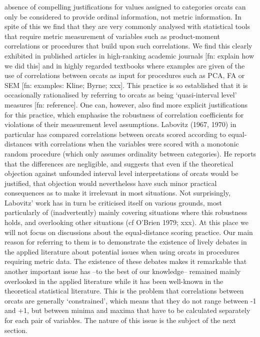\documentclass[
  12pt,
]{article}
\theoremstyle{plain}
\theoremstyle{definition}
\theoremstyle{remark}
\begin{document}
absence of compelling justifications for values assigned to categories
orcats can only be considered to provide ordinal information, not metric
information. In spite of this we find that they are very commonly
analysed with statistical tools that require metric measurement of
variables such as product-moment correlations or procedures that build
upon such correlations. We find this clearly exhibited in published
articles in high-ranking academic journals {[}fn: explain how we did
this{]} and in highly regarded textbooks where examples are given of the
use of correlations between orcats as input for procedures such as PCA,
FA or SEM {[}fn: examples: Kline; Byrne; xxx{]}. This practice is so
established that it is occasionally rationalised by referring to orcats
as being `quasi-interval level' measures {[}fn: reference{]}. One can,
however, also find more explicit justifications for this practice, which
emphasise the robustness of correlation coefficients for violations of
their measurement level assumptions. Labovitz (1967, 1970) in particular
has compared correlations between orcats scored according to
equal-distances with correlations when the variables were scored with a
monotonic random procedure (which only assumes ordinality between
categories). He reports that the differences are negligible, and
suggests that even if the theoretical objection against unfounded
interval level interpretations of orcats would be justified, that
objection would nevertheless have such minor practical consequences as
to make it irrelevant in most situations. Not surprisingly, Labovitz'
work has in turn be criticised itself on various grounds, most
particularly of (inadvertently) mainly covering situations where this
robustness holds, and overlooking other situations (cf O'Brien 1979;
xxx). At this place we will not focus on discussions about the
equal-distance scoring practice. Our main reason for referring to them
is to demonstrate the existence of lively debates in the applied
literature about potential issues when using orcats in procedures
requiring metric data. The existence of these debates makes it
remarkable that another important issue has --to the best of our
knowledge-- remained mainly overlooked in the applied literature while
it has been well-known in the theoretical statistical literature. This
is the problem that correlations between orcats are generally
`constrained', which means that they do not range between -1 and +1, but
between minima and maxima that have to be calculated separately for each
pair of variables. The nature of this issue is the subject of the next
section.
\end{document}
